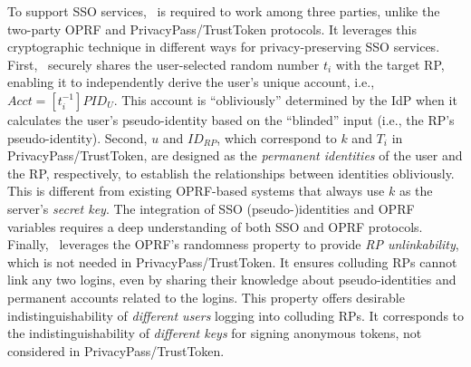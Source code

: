 To support SSO services, \usso\ is required to work among three parties, unlike the two-party OPRF and PrivacyPass/TrustToken protocols.
It leverages this cryptographic technique in different ways for privacy-preserving SSO services. %
First, \usso\ securely shares the user-selected random number $t_i$ with the target RP,
enabling it to independently derive the user's unique account, i.e., $Acct = [t_i^{-1}]PID_{U}$. This account is ``obliviously'' determined by the IdP when it calculates the user's pseudo-identity based on the ``blinded'' input (i.e., the RP's pseudo-identity). Second, $u$ and $ID_{RP}$, which correspond to $k$ and $T_i$ in PrivacyPass/TrustToken, are designed as the \emph{permanent identities} of the user and the RP, respectively, to establish the relationships between identities obliviously.
This is different from existing OPRF-based systems  \cite{privacypass, trusttoken, strong-oprf, oprf-bitcoin-wallet, pesto, oprf-ot-si, pp-ss, Private-Contact-Discovery, o-kms, oprf-deduplication} that always use $k$ as the server's \emph{secret key}.
The integration of SSO (pseudo-)identities  and OPRF variables requires a deep understanding of both SSO and OPRF protocols.
Finally, \usso\ leverages the OPRF's randomness property to provide \emph{RP unlinkability}, which is not needed in PrivacyPass/TrustToken.
It ensures colluding RPs cannot link any two logins, %
even by sharing their knowledge about pseudo-identities and permanent accounts related to the logins.
This property offers desirable indistinguishability of \emph{different users} logging into colluding RPs.
It corresponds to the indistinguishability of \emph{different keys} for signing anonymous tokens, not considered in PrivacyPass/TrustToken. %

